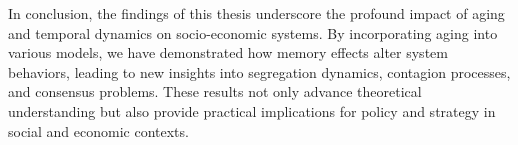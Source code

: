 In conclusion, the findings of this thesis underscore the profound impact of aging and temporal dynamics on socio-economic systems. By incorporating aging into various models, we have demonstrated how memory effects alter system behaviors, leading to new insights into segregation dynamics, contagion processes, and consensus problems. These results not only advance theoretical understanding but also provide practical implications for policy and strategy in social and economic contexts.
